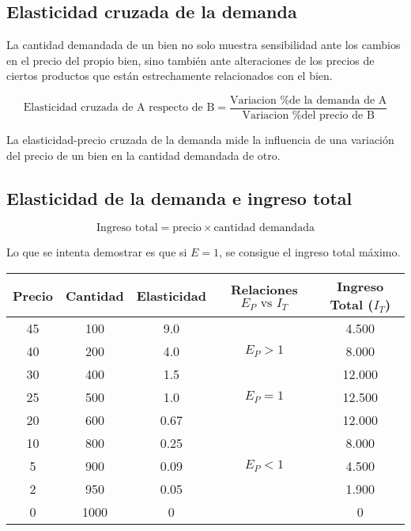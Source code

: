 \subsection{Elasticidad cruzada de la demanda}

La cantidad demandada de un bien no solo muestra sensibilidad ante los cambios en el precio del propio bien,
sino también ante alteraciones de los precios de ciertos productos que están estrechamente relacionados con el bien.

\begin{equation*}
    \text{Elasticidad cruzada de A respecto de B} = \frac{\text{Variacion \% de la demanda de A}}{\text{Variacion \% del precio de B}}
\end{equation*}

La elasticidad-precio cruzada de la demanda mide la influencia de una variación del precio de un bien en la cantidad demandada de otro.

\subsection{Elasticidad de la demanda e ingreso total}

\begin{equation*}
    \text{Ingreso total} = \text{precio} \times \text{cantidad demandada}
\end{equation*}

Lo que se intenta demostrar es que si \(E = 1\),
se consigue el ingreso total máximo.

\begin{table}[h!]
    \centering
    \begin{tabular}{ccccc}
        \hline
        Precio & Cantidad & Elasticidad & Relaciones \(E_P \text{ vs } I_T\) & Ingreso Total (\(I_T\)) \\
        \hline
        45     & 100      & 9.0         &                                    & 4.500                   \\
        40     & 200      & 4.0         & \(E_P > 1\)                        & 8.000                   \\
        30     & 400      & 1.5         &                                    & 12.000                  \\
        25     & 500      & 1.0         & \(E_P = 1\)                        & 12.500                  \\
        20     & 600      & 0.67        &                                    & 12.000                  \\
        10     & 800      & 0.25        &                                    & 8.000                   \\
        5      & 900      & 0.09        & \(E_P < 1\)                        & 4.500                   \\
        2      & 950      & 0.05        &                                    & 1.900                   \\
        0      & 1000     & 0           &                                    & 0                       \\
        \hline
    \end{tabular}
\end{table}

